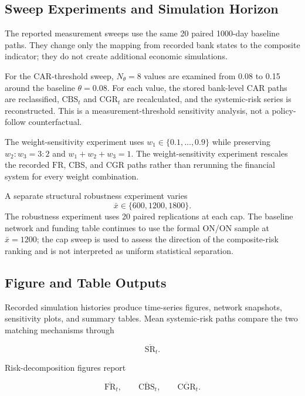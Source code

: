 \subsection{Sweep Experiments and Simulation Horizon}

The reported measurement sweeps use the same 20 paired 1000-day baseline
paths. They change only the mapping from recorded bank states to the
composite indicator; they do not create additional economic simulations.

For the CAR-threshold sweep, \(N_\theta=8\) values are examined from
0.08 to 0.15 around the baseline \(\theta=0.08\). For each value, the
stored bank-level CAR paths are reclassified, \(\mathrm{CBS}_t\) and
\(\mathrm{CGR}_t\) are recalculated, and the systemic-risk series is
reconstructed. This is a measurement-threshold sensitivity analysis,
not a policy-follow counterfactual.

The weight-sensitivity experiment uses \(w_1\in\{0.1,\ldots,0.9\}\) while preserving
\(w_2:w_3=3:2\) and \(w_1+w_2+w_3=1\). The weight-sensitivity experiment
rescales the recorded \(\mathrm{FR}\),
\(\mathrm{CBS}\), and \(\mathrm{CGR}\) paths rather than rerunning the
financial system for every weight combination.

A separate structural robustness experiment varies
\begin{equation}
\bar{x}\in\{600,1200,1800\}.
\end{equation}
The robustness experiment uses 20 paired replications at each cap. The
baseline network and funding table continues to use the formal ON/ON
sample at \(\bar{x}=1200\); the cap sweep is used to assess the direction
of the composite-risk ranking and is not interpreted as uniform
statistical separation.

\subsection{Figure and Table Outputs}

Recorded simulation histories produce time-series figures, network
snapshots, sensitivity plots, and summary tables. Mean systemic-risk
paths compare the two matching mechanisms through

\begin{equation}
\overline{\mathrm{SR}}_{t}.
\end{equation}

Risk-decomposition figures report

\begin{equation}
\overline{\mathrm{FR}}_{t},
\qquad
\overline{\mathrm{CBS}}_{t},
\qquad
\overline{\mathrm{CGR}}_{t}.
\end{equation}

